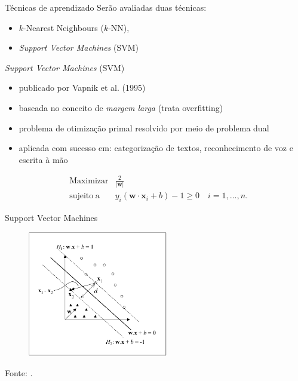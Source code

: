 \documentclass{beamer}
\newcommand{\vect}[1]{\mathbf{#1}}
\newcommand{\norma}[1]{| #1 |}
\begin{document}
\begin{frame}{Técnicas de aprendizado}
Serão avaliadas duas técnicas:
\begin{itemize}
\item $k$-Nearest Neighbours ($k$-NN),
\item \emph{Support Vector Machines} (SVM)
\end{itemize}
\end{frame}

\begin{frame}{\emph{Support Vector Machines} (SVM)}
\begin{itemize}
  \item publicado por Vapnik et al. (1995)\nocite{vapnik1998statistical}
  \item baseada no conceito de \emph{margem larga} (trata overfitting)
  \item problema de otimiza\c{c}ão primal resolvido por meio de problema
dual
  \item aplicada com sucesso em: categorização de textos, reconhecimento de
voz e escrita à mão\cite{bennett2000support}
\end{itemize}

\begin{eqnarray}
& \label{eq:max_w0}\operatorname{Maximizar} & \frac{2}{\norma{\vect{w}}} \\
& \label{eq:max_w1} \operatorname{sujeito\;a} & y_i(\vect{w}\cdot\vect{x}_i + b) - 1 \ge 0 \quad i = 1,\dotsc,n.
\end{eqnarray}

\end{frame}

\begin{frame}{Support Vector Machines}
\begin{figure}
\centering
\includegraphics[height=5.5cm]{img/fig-hiperplanos.png}
\end{figure}
\tiny{Fonte: \cite{lorena2003introducaoas}.}
\end{frame}
\end{document}
